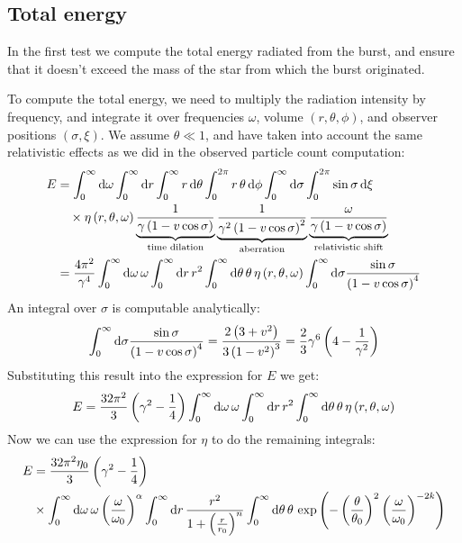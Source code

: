 \documentclass[manuscript]{aastex}
\begin{document}
\subsection{Total energy}

In the first test we compute the total energy radiated from the burst,
and ensure that it doesn't exceed the mass of the star from which
the burst originated.

To compute the total energy, we need to multiply the radiation
intensity by frequency, and integrate it over frequencies $\omega$,
volume $\left(r,\theta,\phi\right)$, and observer positions
$\left(\sigma, \xi\right)$. We assume $\theta \ll 1$, and have taken
into account the same relativistic effects as we did in the observed
particle count computation:
\begin{align}
E &= \int_0^\infty \dif \omega \int_0^\infty \dif r \int_0^\infty r \dif \theta \int_0^{2\pi} r \, \theta \dif \phi \int_0^\infty \dif \sigma \int_0^{2\pi} \sin\sigma \dif \xi \nonumber\\
&\quad {} \times \eta\left( r,\theta,\omega \right) \underbrace{\frac{1}{\gamma\left(1-v\cos\sigma \right)}}_{\text{time dilation}} \underbrace{\frac{1}{\gamma^2\left(1-v\cos\sigma \right)^2}}_{\text{aberration}} \underbrace{\frac{\omega}{\gamma\left(1-v\cos\sigma \right)}}_{\text{relativistic shift}} \\
&= \frac{4\pi^2}{\gamma^4} \int_0^\infty \dif \omega \, \omega \int_0^\infty \dif r \, r^2 \int_0^\infty \dif \theta \, \theta \, \eta\left( r,\theta,\omega \right) \int_0^\infty \dif \sigma \frac{\sin\sigma}{\left(1-v\cos\sigma \right)^4} \nonumber
\end{align}
An integral over $\sigma$ is computable analytically:
\begin{equation*}
\int_0^\infty \dif \sigma \frac{\sin\sigma}{\left(1-v\cos\sigma \right)^4} = \frac{2\left(3+v^2\right)}{3\left(1-v^2\right)^3} = \frac{2}{3}\gamma^6 \left(4 - \frac{1}{\gamma^2}\right)
\end{equation*}
Substituting this result into the expression for $E$ we get:
\begin{equation}
E = \frac{32\pi^2}{3}\left(\gamma^2 - \frac{1}{4}\right) \int_0^\infty \dif \omega \, \omega \int_0^\infty \dif r \, r^2 \int_0^\infty \dif \theta \, \theta \, \eta\left( r,\theta,\omega \right)
\end{equation}
Now we can use the expression for $\eta$ to do the remaining integrals:
\begin{align*}
E &= \frac{32\pi^2 \eta_0}{3}\left(\gamma^2 - \frac{1}{4}\right) \\
&\times \int_0^\infty \dif \omega \, \omega \left(\frac{\omega}{\omega_0}\right)^\alpha \int_0^\infty \dif r \, \frac{r^2}{1 + \left(\frac{r}{r_0}\right)^n} \int_0^\infty \dif \theta \, \theta \, \exp\left(-\left(\frac{\theta}{\theta_0}\right)^2\left(\frac{\omega}{\omega_0}\right)^{-2k}\right)
\end{align*}
\end{document}
